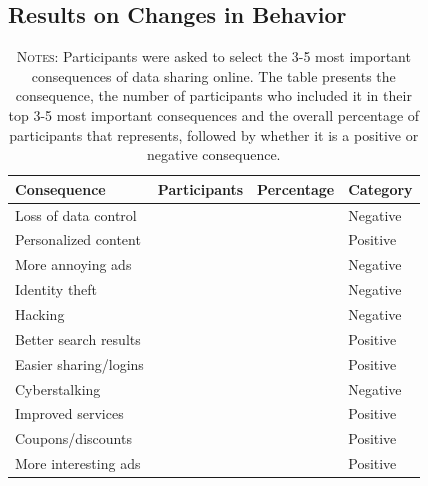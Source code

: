 \documentclass[12pt]{article}
\theoremstyle{definition}
\theoremstyle{remark}
\begin{document}
\begin{appendix}
\subsection{Results on Changes in Behavior}


\begin{table}[H]
\centering
\caption{Data Sharing Purposes}\label{tab:data_sharing_purpose}
\begin{tabular}{lrrl}
  \hline
Consequence & Participants & Percentage & Category \\ 
  \hline
Loss of data control & \dataPurposeLossControlN{} & \dataPurposeLossControlPct{} & Negative \\ 
  Personalized content & \dataPurposePersonalizedN{} & \dataPurposePersonalizedPct{} & Positive \\ 
  More annoying ads & \dataPurposeAnnoyingAdsN{} & \dataPurposeAnnoyingAdsPct{} & Negative \\ 
  Identity theft & \dataPurposeIdentityTheftN{} & \dataPurposeIdentityTheftPct{} & Negative \\ 
  Hacking & \dataPurposeHackingN{} & \dataPurposeHackingPct{} & Negative \\ 
  Better search results & \dataPurposeBetterSearchN{} & \dataPurposeBetterSearchPct{} & Positive \\ 
  Easier sharing/logins & \dataPurposeEasierSharingN{} & \dataPurposeEasierSharingPct{} & Positive \\ 
  Cyberstalking & \dataPurposeCyberstalkingN{} & \dataPurposeCyberstalkingPct{} & Negative \\ 
  Improved services & \dataPurposeImprovedServicesN{} & \dataPurposeImprovedServicesPct{} & Positive \\ 
  Coupons/discounts & \dataPurposeCouponsN{} & \dataPurposeCouponsPct{} & Positive \\ 
  More interesting ads & \dataPurposeInterestingAdsN{} & \dataPurposeInterestingAdsPct{} & Positive \\ 
   \hline
\end{tabular}
\caption*{\scriptsize \textsc{Notes}: Participants were asked to select the 3-5 most important consequences of data sharing online. The table presents the consequence, the number of participants who included it in their top 3-5 most important consequences and the overall percentage of participants that represents, followed by whether it is a positive or negative consequence.}
\end{table}



\end{appendix}
\end{document}
